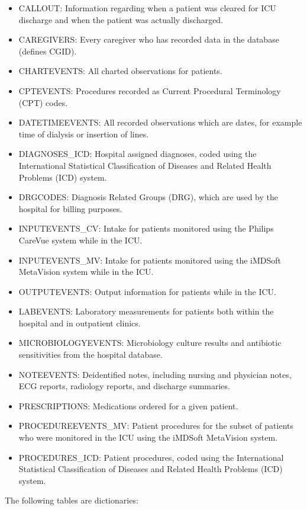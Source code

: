 \documentclass[english]{article}
\begin{document}
\begin{itemize}
  \item CALLOUT: Information regarding when a patient was cleared for ICU discharge and when the patient was actually discharged.
  \item CAREGIVERS: Every caregiver who has recorded data in the database (defines CGID).
  \item CHARTEVENTS: All charted observations for patients.
  \item CPTEVENTS: Procedures recorded as Current Procedural Terminology (CPT) codes.
  \item DATETIMEEVENTS: All recorded observations which are dates, for example time of dialysis or insertion of lines.
  \item DIAGNOSES\_ICD: Hospital assigned diagnoses, coded using the International Statistical Classification of Diseases and Related Health Problems (ICD) system.
  \item DRGCODES: Diagnosis Related Groups (DRG), which are used by the hospital for billing purposes.
  \item INPUTEVENTS\_CV: Intake for patients monitored using the Philips CareVue system while in the ICU.
  \item INPUTEVENTS\_MV: Intake for patients monitored using the iMDSoft MetaVision system while in the ICU.
  \item OUTPUTEVENTS: Output information for patients while in the ICU.
  \item LABEVENTS: Laboratory measurements for patients both within the hospital and in outpatient clinics.
  \item MICROBIOLOGYEVENTS: Microbiology culture results and antibiotic sensitivities from the hospital database.
  \item NOTEEVENTS: Deidentified notes, including nursing and physician notes, ECG reports, radiology reports, and discharge summaries.
  \item PRESCRIPTIONS: Medications ordered for a given patient.
  \item PROCEDUREEVENTS\_MV: Patient procedures for the subset of patients who were monitored in the ICU using the iMDSoft MetaVision system.
  \item PROCEDURES\_ICD: Patient procedures, coded using the International Statistical Classification of Diseases and Related Health Problems (ICD) system.
\end{itemize}

The following tables are dictionaries:
\end{document}
